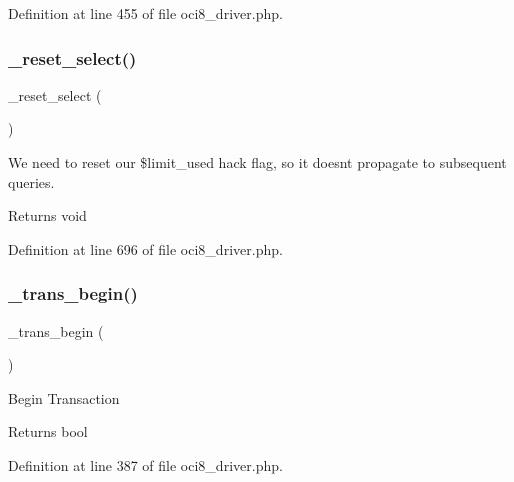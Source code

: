 Definition at line 455 of file oci8\+\_\+driver.\+php.

\mbox{\label{class_c_i___d_b__oci8__driver_a7c6cc16411b9c36fbfd42a9317f64317}} 
\subsubsection{\texorpdfstring{\_reset\_select()}{\_reset\_select()}}
{\footnotesize\ttfamily \+\_\+reset\+\_\+select (\begin{DoxyParamCaption}{ }\end{DoxyParamCaption})\hspace{0.3cm}{\ttfamily [protected]}}

We need to reset our \$limit\+\_\+used hack flag, so it doesn\textquotesingle{}t propagate to subsequent queries.

\begin{DoxyReturn}{Returns}
void 
\end{DoxyReturn}


Definition at line 696 of file oci8\+\_\+driver.\+php.

\mbox{\label{class_c_i___d_b__oci8__driver_ac81ac882c1d54347d810199a15856aac}} 
\subsubsection{\texorpdfstring{\_trans\_begin()}{\_trans\_begin()}}
{\footnotesize\ttfamily \+\_\+trans\+\_\+begin (\begin{DoxyParamCaption}{ }\end{DoxyParamCaption})\hspace{0.3cm}{\ttfamily [protected]}}

Begin Transaction

\begin{DoxyReturn}{Returns}
bool 
\end{DoxyReturn}


Definition at line 387 of file oci8\+\_\+driver.\+php.

\mbox{\label{class_c_i___d_b__oci8__driver_a6fe7f373e0b11cfae23a5f41c0b35dda}} 
